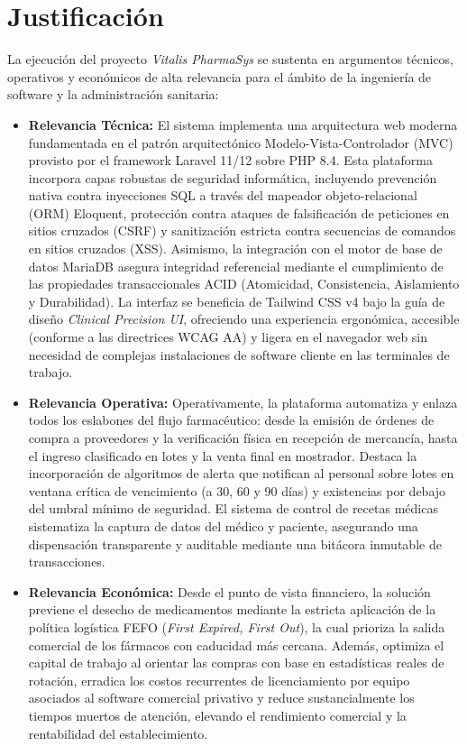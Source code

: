 \section{Justificación}

La ejecución del proyecto \textit{Vitalis PharmaSys} se sustenta en argumentos técnicos, operativos y económicos de alta relevancia para el ámbito de la ingeniería de software y la administración sanitaria:

\begin{itemize}
    \item \textbf{Relevancia Técnica:} El sistema implementa una arquitectura web moderna fundamentada en el patrón arquitectónico Modelo-Vista-Controlador (MVC) provisto por el framework Laravel 11/12 sobre PHP 8.4. Esta plataforma incorpora capas robustas de seguridad informática, incluyendo prevención nativa contra inyecciones SQL a través del mapeador objeto-relacional (ORM) Eloquent, protección contra ataques de falsificación de peticiones en sitios cruzados (CSRF) y sanitización estricta contra secuencias de comandos en sitios cruzados (XSS). Asimismo, la integración con el motor de base de datos MariaDB asegura integridad referencial mediante el cumplimiento de las propiedades transaccionales ACID (Atomicidad, Consistencia, Aislamiento y Durabilidad). La interfaz se beneficia de Tailwind CSS v4 bajo la guía de diseño \textit{Clinical Precision UI}, ofreciendo una experiencia ergonómica, accesible (conforme a las directrices WCAG AA) y ligera en el navegador web sin necesidad de complejas instalaciones de software cliente en las terminales de trabajo.
    \item \textbf{Relevancia Operativa:} Operativamente, la plataforma automatiza y enlaza todos los eslabones del flujo farmacéutico: desde la emisión de órdenes de compra a proveedores y la verificación física en recepción de mercancía, hasta el ingreso clasificado en lotes y la venta final en mostrador. Destaca la incorporación de algoritmos de alerta que notifican al personal sobre lotes en ventana crítica de vencimiento (a 30, 60 y 90 días) y existencias por debajo del umbral mínimo de seguridad. El sistema de control de recetas médicas sistematiza la captura de datos del médico y paciente, asegurando una dispensación transparente y auditable mediante una bitácora inmutable de transacciones.
    \item \textbf{Relevancia Económica:} Desde el punto de vista financiero, la solución previene el desecho de medicamentos mediante la estricta aplicación de la política logística FEFO (\textit{First Expired, First Out}), la cual prioriza la salida comercial de los fármacos con caducidad más cercana. Además, optimiza el capital de trabajo al orientar las compras con base en estadísticas reales de rotación, erradica los costos recurrentes de licenciamiento por equipo asociados al software comercial privativo y reduce sustancialmente los tiempos muertos de atención, elevando el rendimiento comercial y la rentabilidad del establecimiento.
\end{itemize}

